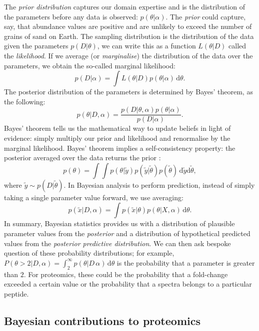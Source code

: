\documentclass[12pt,english, journal=jpr, layout=twocolumn]{article}
\begin{document}
The \textit{prior distribution} captures our domain expertise and is the distribution of the parameters before any data is observed: $p(\theta|\alpha)$. The \textit{prior} could capture, say, that abundance values are positive and are unlikely to exceed the number of grains of sand on Earth. The sampling distribution is the distribution of the data given the parameters $p(D|\theta)$, we can write this as a function $L(\theta|D)$ called the \textit{likelihood}. If we average (or \textit{marginalise}) the distribution of the data over the parameters, we obtain the so-called marginal likelihood:
\begin{equation}
p(D|\alpha) = \int L(\theta|D)p(\theta|\alpha)\,\text{d}\theta.
\end{equation}
The posterior distribution of the parameters is determined by Bayes' theorem, as the following:
\begin{equation}
p(\theta|D, \alpha) = \frac{p(D|\theta, \alpha)p(\theta|\alpha)}{p(D|\alpha)}.
\end{equation}
Bayes' theorem tells us the mathematical way to update beliefs in light of evidence: simply multiply our prior and likelihood and renormalise by the marginal likelihood. Bayes' theorem implies a self-consistency property: the posterior averaged over the data returns the prior \citep{Talts::2018}:
\begin{equation}
p(\theta) = \int \int p(\theta|\tilde{y})p(\tilde{y}|\tilde{\theta})p(\tilde{\theta})\,\text{d}\tilde{y}\text{d}\tilde{\theta},
\end{equation}
where $\tilde{y} \sim p(D|\tilde{\theta})$. In Bayesian analysis to perform prediction, instead of simply taking a single parameter value forward, we use averaging:
\begin{equation}
p(\tilde{x}|D,\alpha) = \int p(\tilde{x}|\theta)p(\theta|X,\alpha)\,\text{d}\theta.
\end{equation}
In summary, Bayesian statistics provides us with a distribution of plausible parameter values from the \textit{posterior} and a distribution of hypothetical predicted values from the \textit{posterior predictive distribution}. We can then ask bespoke question of these probability distributions; for example, $P(\theta > 2|D, \alpha) = \int_{2}^{\infty}p(\theta|D\,\alpha)\,\text{d}\theta$ is the probability that a parameter is greater than $2$. For proteomics, these could be the probability that a fold-change exceeded a certain value or the probability that a spectra belongs to a particular peptide. 
\subsection{Bayesian contributions to proteomics}
\end{document}
